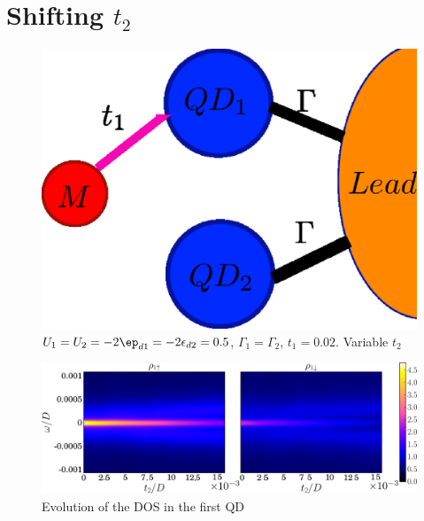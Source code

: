 
\section{Shifting $t_2$}


\begin{figure}[h]
\centering
\includegraphics[scale=0.2]{Plots/Model/Majorana-1QD.eps}
\caption{\label{fig:Mod/Shift_t2}$U_{1}=U_{2}=-2\ep_{d1}=-2\epsilon_{d2}=0.5$, $\Gamma_{1}=\Gamma_{2}$,
$t_{1}=0.02$. Variable $t_2$}
\end{figure}


\begin{figure}[hbt]
\centering
\includegraphics[scale=0.38]{Plots/2D/Shift_t2D1.png}
\caption{\label{fig:DOS/Shift_t2D1} Evolution of the DOS in the first QD }
\end{figure}



